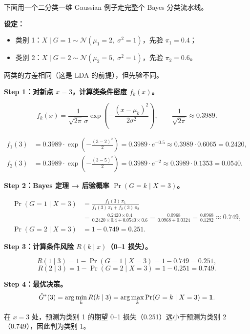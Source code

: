 下面用一个二分类一维 Gaussian 例子走完整个 Bayes 分类流水线。

\medskip
\noindent\textbf{设定：}
\begin{itemize}
    \item 类别 1：$X \mid G=1 \sim \mathcal{N}(\mu_1=2,\; \sigma^2=1)$，先验 $\pi_1 = 0.4$；
    \item 类别 2：$X \mid G=2 \sim \mathcal{N}(\mu_2=5,\; \sigma^2=1)$，先验 $\pi_2 = 0.6$。
\end{itemize}
两类的方差相同（这是 LDA 的前提），但先验不同。

\medskip
\noindent\textbf{Step 1：对新点 $x=3$，计算类条件密度 $f_k(x)$。}

\[
f_k(x) = \frac{1}{\sqrt{2\pi}\,\sigma} \exp\!\left(-\frac{(x-\mu_k)^2}{2\sigma^2}\right),\qquad
\frac{1}{\sqrt{2\pi}} \approx 0.3989.
\]

\[
\begin{aligned}
f_1(3) &= 0.3989 \cdot \exp\!\left(-\frac{(3-2)^2}{2}\right)
       = 0.3989 \cdot e^{-0.5}
       \approx 0.3989 \cdot 0.6065 = 0.2420, \\[4pt]
f_2(3) &= 0.3989 \cdot \exp\!\left(-\frac{(3-5)^2}{2}\right)
       = 0.3989 \cdot e^{-2}
       \approx 0.3989 \cdot 0.1353 = 0.0540.
\end{aligned}
\]

\noindent\textbf{Step 2：Bayes 定理 → 后验概率 $\Pr(G=k \mid X=3)$。}

\[
\begin{aligned}
\Pr(G=1 \mid X=3) &= \frac{f_1(3)\,\pi_1}{f_1(3)\,\pi_1 + f_2(3)\,\pi_2} \\
&= \frac{0.2420 \times 0.4}{0.2420 \times 0.4 + 0.0540 \times 0.6}
 = \frac{0.0968}{0.0968 + 0.0324}
 = \frac{0.0968}{0.1292}
 \approx \mathbf{0.749}, \\[8pt]
\Pr(G=2 \mid X=3) &= 1 - 0.749 = \mathbf{0.251}.
\end{aligned}
\]

\noindent\textbf{Step 3：计算条件风险 $R(k \mid x)$（0--1 损失）。}

\[
R(1 \mid 3) = 1 - \Pr(G=1 \mid X=3) = 1 - 0.749 = \mathbf{0.251},
\]
\[
R(2 \mid 3) = 1 - \Pr(G=2 \mid X=3) = 1 - 0.251 = \mathbf{0.749}.
\]

\noindent\textbf{Step 4：最优决策。}
\[
\hat{G}^*(3) = \arg\min_k R(k \mid 3) = \arg\max_k \Pr(G=k \mid X=3) = \mathbf{1}.
\]

在 $x=3$ 处，预测为类别 1 的期望 0--1 损失（0.251）远小于预测为类别 2（0.749），因此判为类别 1。

